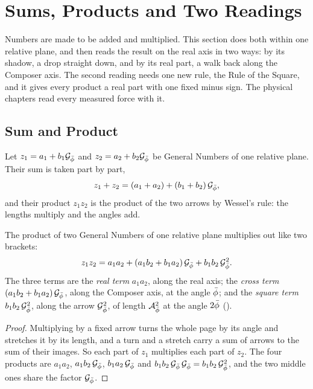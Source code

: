 \section{Sums, Products and Two Readings}\label{sec:gn-shadows}

Numbers are made to be added and multiplied. This section does both within one relative plane, and then reads the result on the real axis in two ways: by its shadow, a drop straight down, and by its real part, a walk back along the Composer axis. The second reading needs one new rule, the Rule of the Square, and it gives every product a real part with one fixed minus sign. The physical chapters read every measured force with it.

\subsection{Sum and Product}\label{subsec:gn-product}

\begin{definition}\label{def:gn-product}
Let $z_1 = a_1 + b_1\mathcal{G}_{\bar{\phi}}$ and $z_2 = a_2 + b_2\mathcal{G}_{\bar{\phi}}$ be General Numbers of one relative plane. Their sum is taken part by part,
\[
z_1 + z_2 = (a_1 + a_2) + (b_1 + b_2)\,\mathcal{G}_{\bar{\phi}} ,
\]
and their product $z_1 z_2$ is the product of the two arrows by Wessel's rule: the lengths multiply and the angles add.
\end{definition}

\begin{proposition}\label{prop:three-terms}
The product of two General Numbers of one relative plane multiplies out like two brackets:
\[
z_1 z_2 = a_1 a_2 + (a_1 b_2 + b_1 a_2)\,\mathcal{G}_{\bar{\phi}} + b_1 b_2\,\mathcal{G}_{\bar{\phi}}^2 .
\]
The three terms are the \emph{real term} $a_1 a_2$, along the real axis; the \emph{cross term} $(a_1 b_2 + b_1 a_2)\,\mathcal{G}_{\bar{\phi}}$, along the Composer axis, at the angle $\bar{\phi}$; and the \emph{square term} $b_1 b_2\,\mathcal{G}_{\bar{\phi}}^2$, along the arrow $\mathcal{G}_{\bar{\phi}}^2$, of length $\mathcal{A}_{\bar{\phi}}^2$ at the angle $2\bar{\phi}$ ().
\end{proposition}

\begin{proof}
Multiplying by a fixed arrow turns the whole page by its angle and stretches it by its length, and a turn and a stretch carry a sum of arrows to the sum of their images. So each part of $z_1$ multiplies each part of $z_2$. The four products are $a_1 a_2$, $a_1 b_2\,\mathcal{G}_{\bar{\phi}}$, $b_1 a_2\,\mathcal{G}_{\bar{\phi}}$ and $b_1 b_2\,\mathcal{G}_{\bar{\phi}}\,\mathcal{G}_{\bar{\phi}} = b_1 b_2\,\mathcal{G}_{\bar{\phi}}^2$, and the two middle ones share the factor $\mathcal{G}_{\bar{\phi}}$.
\end{proof}

